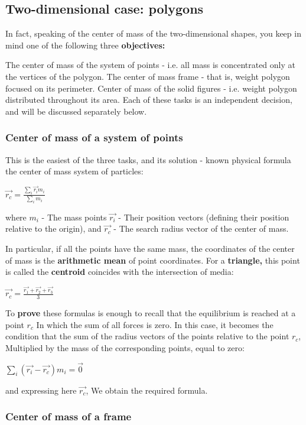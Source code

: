 \subsection{ Two-dimensional case: polygons }

In fact, speaking of the center of mass of the two-dimensional shapes, you keep in mind one of the following three \textbf{objectives:}

The center of mass of the system of points - i.e. all mass is concentrated only at the vertices of the polygon.
The center of mass frame - that is, weight polygon focused on its perimeter.
Center of mass of the solid figures - i.e. weight polygon distributed throughout its area.
Each of these tasks is an independent decision, and will be discussed separately below.

\subsubsection{ Center of mass of a system of points }

This is the easiest of the three tasks, and its solution - known physical formula the center of mass system of particles:

$\vec{r_{c}}=\frac{\sum_{i}\vec{r_{i}}m_{i}}{\sum_{i}m_{i}}$

where $m_i$ - The mass points $\vec {r_i}$ - Their position vectors (defining their position relative to the origin), and $\vec {r_c}$ - The search radius vector of the center of mass.

In particular, if all the points have the same mass, the coordinates of the center of mass is the \textbf{arithmetic mean} of point coordinates. For a \textbf{triangle,} this point is called the \textbf{centroid} coincides with the intersection of media:

$\vec{r_{c}}=\frac{\vec{r_{1}}+\vec{r_{2}}+\vec{r_{3}}}{3}$

To \textbf{prove} these formulas is enough to recall that the equilibrium is reached at a point $r_c$ In which the sum of all forces is zero. In this case, it becomes the condition that the sum of the radius vectors of the points relative to the point $r_c$, Multiplied by the mass of the corresponding points, equal to zero:

$\sum_{i}(\vec{r_{i}}-\vec{r_{c}})m_{i}=\vec{0}$

and expressing here $\vec {r_c}$, We obtain the required formula.

\subsubsection{ Center of mass of a frame }

